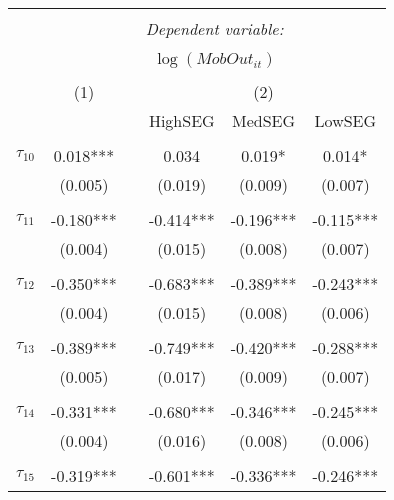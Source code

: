 \begin{tabular}{@{\extracolsep{-0pt}}lccccc} 
\\[-1.8ex]\hline 
\hline \\[-1.8ex] 
 & \multicolumn{5}{c}{\textit{Dependent variable:}} \\ 
\cline{2-6} 
\\[-1.8ex] & \multicolumn{5}{c}{$\log(MobOut_{it})$}\\ 
\\[-1.8ex] & (1) && \multicolumn{3}{c}{(2)} \\ 
\cline{2-2}\cline{4-6}
        &&& HighSEG & MedSEG & LowSEG  \\
 \\[-1.8ex] 
$\tau_{10}$     & 0.018***  &&   0.034   &   0.019*  &   0.014*  \\
                &  (0.005)  &&  (0.019)  &  (0.009)  &  (0.007)  \\
                &           &&           &           &           \\[-2.1ex]
$\tau_{11}$     & -0.180*** && -0.414*** & -0.196*** & -0.115*** \\
                &  (0.004)  &&  (0.015)  &  (0.008)  &  (0.007)  \\
                &           &&           &           &           \\[-2.1ex]
$\tau_{12}$     & -0.350*** && -0.683*** & -0.389*** & -0.243*** \\
                &  (0.004)  &&  (0.015)  &  (0.008)  &  (0.006)  \\
                &           &&           &           &           \\[-2.1ex]
$\tau_{13}$     & -0.389*** && -0.749*** & -0.420*** & -0.288*** \\
                &  (0.005)  &&  (0.017)  &  (0.009)  &  (0.007)  \\
                &           &&           &           &           \\[-2.1ex]
$\tau_{14}$     & -0.331*** && -0.680*** & -0.346*** & -0.245*** \\
                &  (0.004)  &&  (0.016)  &  (0.008)  &  (0.006)  \\
                &           &&           &           &           \\[-2.1ex]
$\tau_{15}$     & -0.319*** && -0.601*** & -0.336*** & -0.246*** \\

\end{tabular}
